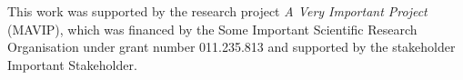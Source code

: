 \begin{titlepage}
\vfill

\vspace*{2\bigskipamount}

\noindent This work was supported by the research project \emph{A Very Important Project} (MAVIP), which was financed by the Some Important Scientific Research Organisation under grant number 011.235.813 and supported by the stakeholder Important Stakeholder.


\end{titlepage}
